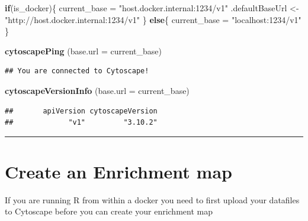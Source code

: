\documentclass[
]{book}
\newenvironment{Shaded}{\begin{snugshade}}{\end{snugshade}}
\newcommand{\AttributeTok}[1]{\textcolor[rgb]{0.13,0.29,0.53}{#1}}
\newcommand{\ControlFlowTok}[1]{\textcolor[rgb]{0.13,0.29,0.53}{\textbf{#1}}}
\newcommand{\FunctionTok}[1]{\textcolor[rgb]{0.13,0.29,0.53}{\textbf{#1}}}
\newcommand{\NormalTok}[1]{#1}
\newcommand{\OtherTok}[1]{\textcolor[rgb]{0.56,0.35,0.01}{#1}}
\newcommand{\StringTok}[1]{\textcolor[rgb]{0.31,0.60,0.02}{#1}}
\begin{document}
\begin{Shaded}
\begin{Highlighting}[]
\ControlFlowTok{if}\NormalTok{(is\_docker)\{}
\NormalTok{  current\_base }\OtherTok{=} \StringTok{"host.docker.internal:1234/v1"}
\NormalTok{  .defaultBaseUrl }\OtherTok{\textless{}{-}} \StringTok{"http://host.docker.internal:1234/v1"}
\NormalTok{\} }\ControlFlowTok{else}\NormalTok{\{}
\NormalTok{  current\_base }\OtherTok{=} \StringTok{"localhost:1234/v1"}
\NormalTok{\}}

\FunctionTok{cytoscapePing}\NormalTok{ (}\AttributeTok{base.url =}\NormalTok{ current\_base)}
\end{Highlighting}
\end{Shaded}

\begin{verbatim}
## You are connected to Cytoscape!
\end{verbatim}

\begin{Shaded}
\begin{Highlighting}[]
\FunctionTok{cytoscapeVersionInfo}\NormalTok{ (}\AttributeTok{base.url =}\NormalTok{ current\_base)}
\end{Highlighting}
\end{Shaded}

\begin{verbatim}
##       apiVersion cytoscapeVersion 
##             "v1"         "3.10.2"
\end{verbatim}

\begin{center}\rule{0.5\linewidth}{0.5pt}\end{center}

\section{Create an Enrichment map}\label{create-an-enrichment-map}

If you are running R from within a docker you need to first upload your datafiles to Cytoscape before you can create your enrichment map
\end{document}
